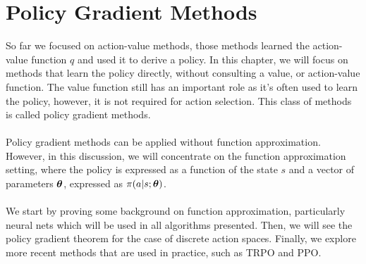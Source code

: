 \chapter{Policy Gradient Methods}
So far we focused on action-value methods, those methods learned the action-value function $q$ and used it to derive a policy. In this chapter, we will focus on methods that learn the policy directly, without consulting a value, or action-value function. The value function still has an important role as it's often used to learn the policy, however, it is not required for action selection. This class of methods is called policy gradient methods.\\\\
Policy gradient methods can be applied without function approximation. However, in this discussion, we will concentrate on the function approximation setting, where the policy is expressed as a function of the state $s$ and a vector of parameters $\boldsymbol{\theta}$, expressed as $\pi(a|s; \boldsymbol{\theta})$.\\\\
We start by proving some background on function approximation, particularly neural nets which will be used in all algorithms presented. Then, we will see the policy gradient theorem for the case of discrete action spaces. Finally, we explore more recent methods that are used in practice, such as TRPO and PPO.\\\\

